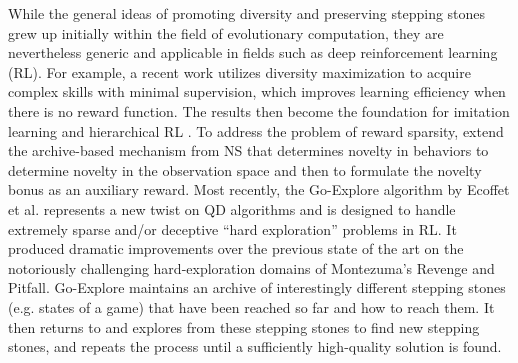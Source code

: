 \documentclass{article}
\newcommand{\todo}[1]{\comments{\textcolor{red}{[TODO: #1]}}}
\newcommand{\ks}[1]{\comments{\textcolor{purple}{[Ken: #1]}}}
\newcommand{\rw}[1]{\comments{\textcolor{blue}{[Rui: #1]}}}
\newcommand{\comments}[1]{#1}
\begin{document}
While the general ideas of promoting diversity and preserving stepping stones grew up initially within the field of evolutionary computation, they are nevertheless generic and applicable in fields such as deep reinforcement learning (RL). For example, a recent work utilizes diversity maximization to acquire complex skills with minimal supervision, which improves learning efficiency when there is no reward function. The results then become the foundation for imitation
learning and hierarchical RL \cite{eysenbach:arxiv18}. 
To address the problem of reward sparsity, \citet{savinov:arxiv18} extend the archive-based mechanism from NS that determines novelty in behaviors to determine novelty in the observation space and then to formulate the novelty bonus as an auxiliary reward. Most recently, the Go-Explore algorithm by Ecoffet et al. \cite{goexplore_blog} %
represents a new twist on QD algorithms and is designed to handle extremely sparse and/or deceptive ``hard exploration'' problems in RL. It produced dramatic improvements over the previous state of the art on the notoriously challenging hard-exploration domains of Montezuma's Revenge and Pitfall. Go-Explore maintains an archive of interestingly different stepping stones (e.g. states of a game) that have been reached so far and how to reach them. It then returns to and explores from these stepping stones to find new stepping stones, and repeats the process until a sufficiently high-quality solution is found. 
\end{document}

